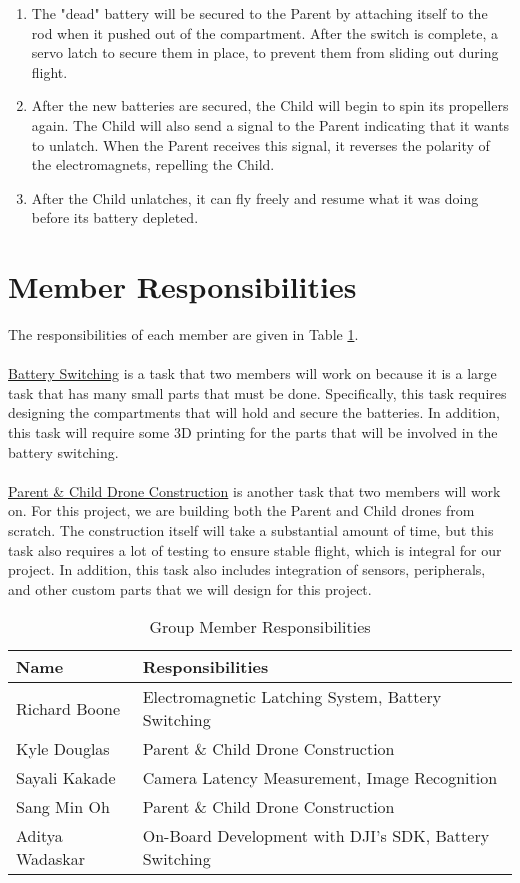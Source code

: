 \documentclass[paper=a4, fontsize=10pt]{scrartcl}
\begin{document}
\begin{enumerate}
	\item The "dead" battery will be secured to the Parent by attaching itself to the rod when it pushed out of the compartment. After the switch is complete, a servo latch to secure them in place, to prevent them from sliding out during flight. 
	\item After the new batteries are secured, the Child will begin to spin its propellers again. The Child will also send a signal to the Parent indicating that it wants to unlatch. When the Parent receives this signal, it reverses the polarity of the electromagnets, repelling the Child.
	\item After the Child unlatches, it can fly freely and resume what it was doing before its battery depleted.
\end{enumerate}

\section{Member Responsibilities}
The responsibilities of each member are given in Table \ref{table:responsibilities}. \\%
\\%
\underline{Battery Switching} is a task that two members will work on because it is a large task that has many small parts that must be done. Specifically, this task requires designing the compartments that will hold and secure the batteries. In addition, this task will require some 3D printing for the parts that will be involved in the battery switching. \\%
\\%
\underline{Parent \& Child Drone Construction} is another task that two members will work on. For this project, we are building both the Parent and Child drones from scratch. The construction itself will take a substantial amount of time, but this task also requires a lot of testing to ensure stable flight, which is integral for our project. In addition, this task also includes integration of sensors, peripherals, and other custom parts that we will design for this project.
\vspace{10pt}
\begin{table}[h!]
	\centering
	\begin{tabular}{|l|l|} 
		\hline
		\textbf{Name} & \textbf{Responsibilities} \\%
		\hline
		\hline
		Richard Boone & Electromagnetic Latching System, Battery Switching \\%
		\hline
		Kyle Douglas & Parent \& Child Drone Construction \\%
		\hline
		Sayali Kakade & Camera Latency Measurement, Image Recognition \\%
		\hline
		Sang Min Oh & Parent \& Child Drone Construction \\%
		\hline
		Aditya Wadaskar & On-Board Development with DJI's SDK, Battery Switching \\%
		\hline
	\end{tabular}
	\caption{Group Member Responsibilities}
	\label{table:responsibilities}
\end{table}




\end{document}

